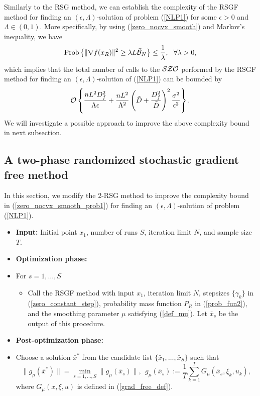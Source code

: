 \documentclass[final]{siamltex}
\newcommand{\beq}{\begin{equation}}
\newcommand{\eeq}{\end{equation}}
\def\eqnok#1{(\ref{#1})}
\def\vgap{\vspace*{.1in}}
\def\prob{{\rm Prob}}
\def\prob{\mathop{\rm Prob}}
\def\SZO{{\cal SZO}}
\def\cB{{\cal B}}
\begin{document}
Similarly to the RSG method, we can establish the complexity of the
RSGF method for finding an $(\epsilon, \Lambda)$-solution of problem \eqnok{NLP1}
for some $\epsilon >0$ and $\Lambda \in (0,1)$.
More specifically, by using \eqnok{zero_nocvx_smooth} and Markov's inequality, we have
\beq \label{zero_nocvx_smooth_prob}
\prob\left\{
\|\nabla f(x_R)\|^2 \ge  \lambda L \bar{\cB}_N \right\}
\le \frac{1}{\lambda}, \ \ \forall \lambda > 0,
\eeq
which implies that the total  number of calls to the $\SZO$
performed by the RSGF method for finding an $(\epsilon, \Lambda)$-solution
of \eqnok{NLP1} can be bounded by
\beq \label{zero_nocvx_smooth_prob1}
{\cal O} \left\{
\frac{n L^2 D_f^2}{\Lambda \epsilon} + \frac{n L^2}{\Lambda^2} \left(\tilde D + \frac{D_f^2}{\tilde D} \right)^2
\frac{\sigma^2}{\epsilon^2} \right\}.
\eeq
We will investigate a possible approach to improve the above complexity bound in next subsection.


\vgap

\subsection{A two-phase randomized stochastic gradient free method} \label{sec_2RSGF}
In this section, we modify the 2-RSG method to improve the complexity bound in
\eqnok{zero_nocvx_smooth_prob1} for finding an $(\epsilon, \Lambda)$-solution of problem \eqnok{NLP1}.

\vgap

\begin{itemize}
\item [] {\bf Input:}
Initial point $x_1$, number of runs $S$, iteration limit $N$, and sample size $T$.
\item [] {\bf Optimization phase:}
\item [] \hspace{0.1in} For $s = 1, \ldots, S$
	\begin{itemize}
	\item [] Call the RSGF method with input $x_1$,
iteration limit $N$, stepsizes $\{\gamma_k\}$ in \eqnok{zero_constant_step},
probability mass function $P_{R}$ in \eqnok{prob_fun2}, and the smoothing parameter
$\mu$ satisfying \eqnok{def_mu}. Let $\bar x_s$ be
the output of this procedure.
\end{itemize}
\item [] {\bf Post-optimization phase:}
\item[] \hspace{0.1in} Choose a solution $\bar x^*$ from the candidate
list $\{\bar x_1, \ldots, \bar x_S\}$ such that
\beq \label{zero_post_opt}
\|g_{\mu}(\bar x^*)\| = \min_{s = 1, \ldots, S} \|g_{\mu}(\bar x_s)\|, \ \
g_{\mu}(\bar x_s) := \frac{1}{T} \sum_{k=1}^T G_{\mu}(\bar x_s, \xi_k, u_k),
\eeq
where $G_\mu(x, \xi, u)$ is defined in \eqnok{grad_free_def}.
\end{itemize}
\end{document}
